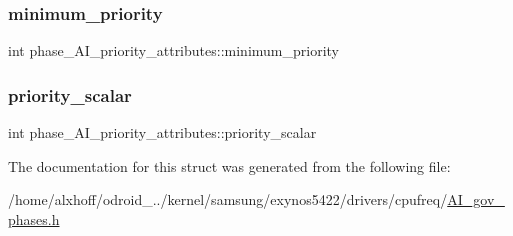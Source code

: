 \subsubsection{\texorpdfstring{minimum\+\_\+priority}{minimum\_priority}}
{\footnotesize\ttfamily int phase\+\_\+\+A\+I\+\_\+priority\+\_\+attributes\+::minimum\+\_\+priority}

\mbox{\label{structphase__AI__priority__attributes_a090c7eda71597fed95fee617ab6c256b}} 
\subsubsection{\texorpdfstring{priority\+\_\+scalar}{priority\_scalar}}
{\footnotesize\ttfamily int phase\+\_\+\+A\+I\+\_\+priority\+\_\+attributes\+::priority\+\_\+scalar}



The documentation for this struct was generated from the following file\+:\begin{DoxyCompactItemize}
\item 
/home/alxhoff/odroid\+\_../kernel/samsung/exynos5422/drivers/cpufreq/\hyperlink{AI__gov__phases_8h}{A\+I\+\_\+gov\+\_\+phases.\+h}\end{DoxyCompactItemize}
